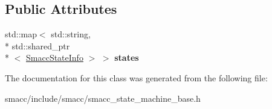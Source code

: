 \subsection*{Public Attributes}
\begin{DoxyCompactItemize}
\item 
\hypertarget{classsmacc_1_1SmaccStateMachineInfo_ab5d31ae049139eddad79708a885d1c25}{std\-::map$<$ std\-::string, \\*
std\-::shared\-\_\-ptr\\*
$<$ \hyperlink{classsmacc_1_1SmaccStateInfo}{Smacc\-State\-Info} $>$ $>$ {\bfseries states}}\label{classsmacc_1_1SmaccStateMachineInfo_ab5d31ae049139eddad79708a885d1c25}

\end{DoxyCompactItemize}


The documentation for this class was generated from the following file\-:\begin{DoxyCompactItemize}
\item 
smacc/include/smacc/smacc\-\_\-state\-\_\-machine\-\_\-base.\-h\end{DoxyCompactItemize}
